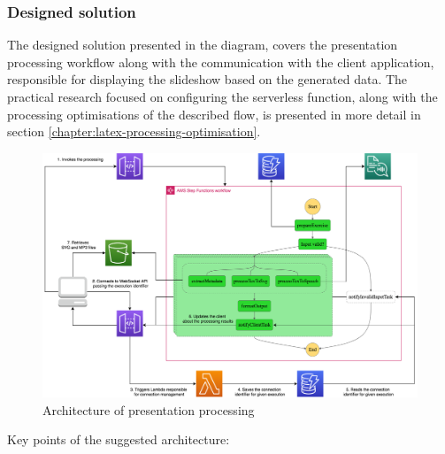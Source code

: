 \subsubsection{Designed solution}

The designed solution presented in the diagram, covers the presentation processing workflow along with the communication with the client application, responsible for displaying the slideshow based on the generated data.
The practical research focused on configuring the serverless function, along with the processing optimisations of the described flow, is presented in more detail in section \ref{chapter:latex-processing-optimisation}.

\begin{figure}[H]
   \centering
   \includegraphics[width=1\textwidth]{assets/04-serverless-for-web-apps/euclidArchitecture.png}
   \caption{Architecture of presentation processing}
   \label{fig:euclid-web-app}
\end{figure}

Key points of the suggested architecture:

